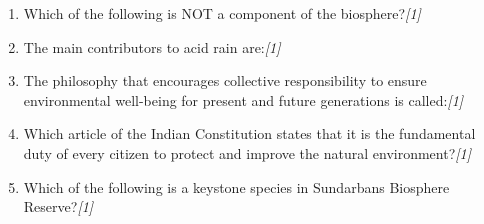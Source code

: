\documentclass[11pt,a4paper]{article}
\newcommand{\pts}[1]{\hfill \textit{[#1]}}
\begin{document}
\begin{enumerate}[label=\textbf{\arabic*.},leftmargin=*,itemsep=8pt]

  \item Which of the following is NOT a component of the biosphere?\pts{1}

  \item The main contributors to acid rain are:\pts{1}

  \item The philosophy that encourages collective responsibility to ensure environmental well-being for present and future generations is called:\pts{1}

  \item Which article of the Indian Constitution states that it is the fundamental duty of every citizen to protect and improve the natural environment?\pts{1}

  \item Which of the following is a keystone species in Sundarbans Biosphere Reserve?\pts{1}


\end{enumerate}
\end{document}
